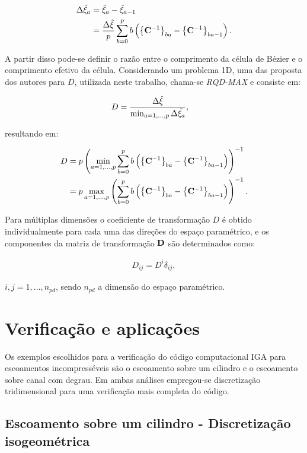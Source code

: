 \documentclass[tese_patricia]{subfiles}
\begin{document}
\begin{align}
	\Delta{\tilde{\xi}_a} &= \tilde{\xi}_a - \tilde{\xi}_{a-1} \\
		           &= \frac{\Delta{\hat{\xi}}}{p} \sum_{b=0}^{p}b\left(\left\{\mathbf{C}^{-1}\right\}_{ba} - \left\{\mathbf{C}^{-1}\right\}_{ba-1}\right).
\end{align}


A partir disso pode-se definir o razão entre o comprimento da célula de Bézier e o comprimento efetivo da célula. Considerando um problema 1D, uma das proposta dos autores para $D$, utilizada neste trabalho, chama-se \textit{RQD-MAX} e consiste em:


\begin{align}
	D&=\frac{\Delta\hat{\xi}}{\min_{a=1,...,p} \Delta\tilde{\xi_{a}}},
\end{align}

\noindent resultando em:

\begin{align}
	D&={p}\left(\min_{a=1,...,p} \sum_{b=0}^{p} b \left(\left\{\mathbf{C}^{-1}\right\}_{ba} - \left\{\mathbf{C}^{-1}\right\}_{ba-1}\right)\right)^{-1} \\
	  &={p}\max_{a=1,...,p}\left(\sum_{b=0}^{p} b \left(\left\{\mathbf{C}^{-1}\right\}_{ba} - \left\{\mathbf{C}^{-1}\right\}_{ba-1}\right)\right)^{-1}.
\end{align}

Para múltiplas dimensões o coeficiente de transformação $D$ é obtido individualmente para cada uma das direções do espaço paramétrico, e os componentes da matriz de transformação $\mathbf{D}$ são determinados como:

\begin{align}
	D_{ij} = D^{i} \delta_{ij},
\end{align}

\noindent $i,j = 1,...,n_{pd}$, sendo $n_{pd}$ a dimensão do espaço paramétrico.


\section{Verificação e aplicações}

 Os exemplos escolhidos para a verificação do código computacional IGA para escoamentos incompresséveis são o escoamento sobre um cilindro e o escoamento sobre canal com degrau. Em ambas análises empregou-se discretização tridimensional para uma verificação mais completa do código. 

\subsection {Escoamento sobre um cilindro - Discretização isogeométrica}
\end{document}
